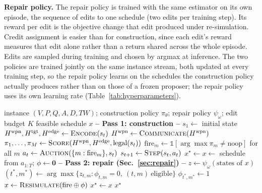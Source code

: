 \textbf{Repair policy.} The repair policy is trained with the same estimator on its own episode, the sequence of edits to one schedule (two edits per training step). Its reward per edit is the objective change that edit produced under re-simulation. Credit assignment is easier than for construction, since each edit's reward measures that edit alone rather than a return shared across the whole episode. Edits are sampled during training and chosen by argmax at inference. The two policies are trained jointly on the same instance stream, both updated at every training step, so the repair policy learns on the schedules the construction policy actually produces rather than on those of a frozen proposer; the repair policy uses its own learning rate (Table~\ref{tab:hyperparameters}).

\begin{algorithm}[htbp]
\caption{SCoPE inference: construction followed by learned repair}
\label{alg:scope}
\begin{algorithmic}[1]
\Require instance $(V, P, Q, A, D, TW)$; construction policy $\pi_\theta$; repair policy $\psi_\omega$; edit budget $K$
\Ensure feasible schedule $x$
\Statex \textbf{-- Pass 1: construction --}
\State $s_1 \gets$ initial state
  \State $H^{\text{wpn}}, H^{\text{tgt}}, H^{\text{edge}} \gets \textsc{Encode}(s_t)$ 
  \State $H^{\text{wpn}} \gets \textsc{Communicate}(H^{\text{wpn}})$ 
  \State $\pi_1,\ldots,\pi_M \gets \textsc{Score}(H^{\text{wpn}}, H^{\text{edge}}, \text{legal}(s_t))$ 
  \State $\text{fire}_m \gets \mathbb{1}[\arg\max \pi_m \neq \text{noop}]$ for all $m$
  \State $a_t \gets \textsc{Auction}(\{m : \text{fire}_m\}, s_t)$ 
  \State $s_{t+1} \gets \textsc{Step}(s_t, a_t)$ 
\EndFor
\State $x^\star \gets x \gets$ schedule from $a_{1:T}$; \; $\phi \gets \bm{0}$
\Statex \textbf{-- Pass 2: repair (Sec.~\ref{sec:repair}) --}
  \State $z \gets \psi_\omega(\text{states of } x)$ 
  \State $(t^\ast\!,m^\ast) \gets \arg\max\{z_{t,m} : \phi_{t,m}=0,\ (t,m)\ \text{eligible}\}$
  \State $\phi_{t^\ast\!,m^\ast} \gets 1$
  \State $x \gets \textsc{Resimulate}(\text{fire} \oplus \phi)$ 
   $x^\star \gets x$ \EndIf
\EndFor
\State \Return $x^\star$
\end{algorithmic}
\end{algorithm}

